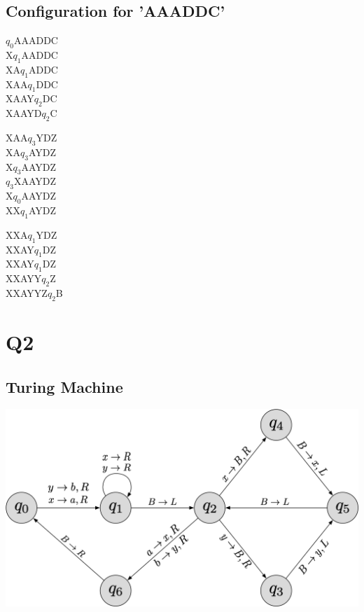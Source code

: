 \documentclass{article}
\begin{document}
	\subsection{Configuration for 'AAADDC'}
	\begin{multicols}{3}
		\begin{minipage}{0.33\textwidth}
			$q_0$AAADDC\\
			X$q_1$AADDC\\
			XA$q_1$ADDC\\
			XAA$q_1$DDC\\
			XAAY$q_2$DC\\
			XAAYD$q_2$C\\
		\end{minipage}
		
		\begin{minipage}{0.33\textwidth}
			XAA$q_3$YDZ\\
			XA$q_3$AYDZ\\
			X$q_3$AAYDZ\\
			$q_3$XAAYDZ\\
			X$q_0$AAYDZ\\
			XX$q_1$AYDZ\\
		\end{minipage}
	
		\begin{minipage}{0.33\textwidth}
			XXA$q_1$YDZ\\
			XXAY$q_1$DZ\\
			XXAY$q_1$DZ\\
			XXAYY$q_2$Z\\
			XXAYYZ$q_2$B\\
		\end{minipage}
	\end{multicols}

	\section{Q2}
	\subsection{Turing Machine}
	\begin{center}
		\vspace{2em}
		\includegraphics[scale=.5]{Q2.png}
	\end{center}
\end{document}
